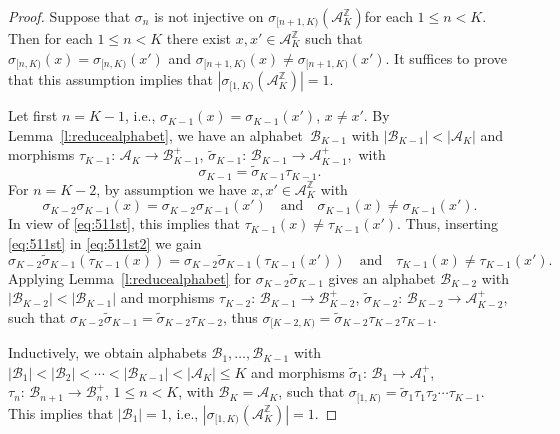 \documentclass{amsart}
\theoremstyle{definition}
\theoremstyle{remark}
\numberwithin{equation}{section}
\begin{document}
\begin{proof}
Suppose that $\sigma_n$ is not injective on $\sigma_{[n+1,K)}(\mathcal{A}_K^\mathbb{Z})$for each $1 \le n < K$. 
Then for each $1 \le n < K$ there exist $x, x' \in \mathcal{A}_K^\mathbb{Z}$ such that $\sigma_{[n,K)}(x) = \sigma_{[n,K)}(x')$ and $\sigma_{[n+1,K)}(x) \ne \sigma_{[n+1,K)}(x')$. 
It suffices to prove that this assumption implies that $|\sigma_{[1,K)}(\mathcal{A}_K^\mathbb{Z})|=1$.

Let first $n = K-1$, i.e., $\sigma_{K-1}(x) = \sigma_{K-1}(x')$, $x \ne x'$. 
By Lemma~\ref{l:reducealphabet}, we have an alphabet~$\mathcal{B}_{K-1}$ with $|\mathcal{B}_{K-1}| < |\mathcal{A}_K|$ and morphisms $\tau_{K-1}:\, \mathcal{A}_K \to \mathcal{B}_{K-1}^+$, $\tilde{\sigma}_{K-1}:\, \mathcal{B}_{K-1} \to \mathcal{A}_{K-1}^+$,~with \begin{equation}\label{eq:511st}
\sigma_{K-1} = \tilde{\sigma}_{K-1} \tau_{K-1}. 
\end{equation}
For $n = K-2$, by assumption we have $x, x' \in \mathcal{A}_K^\mathbb{Z}$ with
\begin{equation}\label{eq:511st2}
\sigma_{K-2} \sigma_{K-1} (x) = \sigma_{K-2} \sigma_{K-1} (x') \quad \mbox{and} \quad \sigma_{K-1}(x) \ne \sigma_{K-1}(x').
\end{equation}
In view of \eqref{eq:511st}, this implies that $\tau_{K-1}(x) \ne \tau_{K-1}(x')$. 
Thus, inserting \eqref{eq:511st} in \eqref{eq:511st2} we gain
\[
\sigma_{K-2} \tilde{\sigma}_{K-1} (\tau_{K-1}(x)) = \sigma_{K-2} \tilde{\sigma}_{K-1} (\tau_{K-1}(x')) \quad \mbox{and} \quad \tau_{K-1}(x) \ne \tau_{K-1}(x').
\]
Applying Lemma~\ref{l:reducealphabet} for $\sigma_{K-2} \tilde{\sigma}_{K-1}$ gives an alphabet $\mathcal{B}_{K-2}$ with $|\mathcal{B}_{K-2}| < |\mathcal{B}_{K-1}|$ and morphisms $\tau_{K-2}:\, \mathcal{B}_{K-1} \to \mathcal{B}_{K-2}^+$, $\tilde{\sigma}_{K-2}:\, \mathcal{B}_{K-2} \to \mathcal{A}_{K-2}^+$, such that $\sigma_{K-2} \tilde{\sigma}_{K-1} = \tilde{\sigma}_{K-2} \tau_{K-2}$, thus $\sigma_{[K-2,K)} = \tilde{\sigma}_{K-2} \tau_{K-2} \tau_{K-1}$.

Inductively, we obtain alphabets $\mathcal{B}_1, \dots, \mathcal{B}_{K-1}$ with $|\mathcal{B}_1| < |\mathcal{B}_2| < \cdots < |\mathcal{B}_{K-1}| < |\mathcal{A}_K| \le K$ and morphisms $\tilde{\sigma}_1:\, \mathcal{B}_1 \to \mathcal{A}_1^+$, $\tau_n:\, \mathcal{B}_{n+1} \to \mathcal{B}_n^+$, $1 \le n < K$, with $\mathcal{B}_K = \mathcal{A}_K$, such that $\sigma_{[1,K)} = \tilde{\sigma}_1 \tau_1 \tau_2 \cdots \tau_{K-1}$. 
This implies that $|\mathcal{B}_1| = 1$, i.e., $|\sigma_{[1,K)}(\mathcal{A}_K^\mathbb{Z})| = 1$.
 \end{proof}
\end{document}
